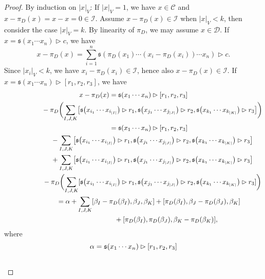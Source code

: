 \documentclass[10pt,a4paper]{amsart}
\numberwithin{equation}{section}
\begin{document}
\begin{proof} By induction on $|x|_V$: If $|x|_V=1$, we have $x \in \mathcal{C}$ and $x-\pi_D(x) = x-x =0 \in \mathcal{I}$. Assume $x-\pi_D(x) \in \mathcal{I}$ when $|x|_V <k$, then consider the case $|x|_V=k$. By linearity of $\pi_D$, we may assume $x \in \mathcal{D}$. If $x = \mathfrak{s}(x_1 \cdots x_n) \rhd c$, we have
\[
x - \pi_D(x) = \sum_{i=1}^n \mathfrak{s}(\pi_D(x_1) \cdots (x_i-\pi_D(x_i)) \cdots x_n) \rhd c.
\]
Since $|x_i|_V < k$, we have $x_i - \pi_D(x_i) \in \mathcal{I}$, hence also $x-\pi_D(x) \in \mathcal{I}$. If $x = \mathfrak{s}(x_1 \cdots x_n) \rhd [r_1, r_2, r_3]$, we have
\begin{gather*}
 x - \pi_D(x) = \mathfrak{s}(x_1 \cdots x_n) \rhd [r_1, r_2, r_3] \\ \hphantom{x - \pi_D(x) =}{}
 - \pi_D \biggl( \sum_{I,J,K} \bigl[\mathfrak{s}\bigl(x_{i_1} \cdots x_{i_{|I|}}\bigr) \rhd r_1, \mathfrak{s}\bigl(x_{j_1} \cdots x_{j_{|J|}}\bigr) \rhd r_2, \mathfrak{s}\bigl(x_{k_1} \cdots x_{k_{|K|}}\bigr) \rhd r_3\bigr] \biggr) \\ \hphantom{x - \pi_D(x) }{}
 = \mathfrak{s}(x_1 \cdots x_n) \rhd [r_1, r_2, r_3] \\ \hphantom{x - \pi_D(x) =}{}
 - \sum_{I,J,K} \bigl[\mathfrak{s}\bigl(x_{i_1} \cdots x_{i_{|I|}}\bigr) \rhd r_1, \mathfrak{s}\bigl(x_{j_1} \cdots x_{j_{|J|}}\bigr) \rhd r_2, \mathfrak{s}\bigl(x_{k_1} \cdots x_{k_{|K|}}\bigr) \rhd r_3\bigr] \\ \hphantom{x - \pi_D(x) =}{}
 + \sum_{I,J,K} \bigl[\mathfrak{s}\bigl(x_{i_1} \cdots x_{i_{|I|}}\bigr) \rhd r_1, \mathfrak{s}\bigl(x_{j_1} \cdots x_{j_{|J|}}\bigr) \rhd r_2, \mathfrak{s}\bigl(x_{k_1} \cdots x_{k_{|K|}}\bigr) \rhd r_3\bigr] \\ \hphantom{x - \pi_D(x) =}{}
 - \pi_D \biggl( \sum_{I,J,K} [\mathfrak{s}\bigl(x_{i_1} \cdots x_{i_{|I|}}\bigr) \rhd r_1, \mathfrak{s}\bigl(x_{j_1} \cdots x_{j_{|J|}}\bigr) \rhd r_2, \mathfrak{s}\bigl(x_{k_1} \cdots x_{k_{|K|}}\bigr) \rhd r_3] \biggr) \\ \hphantom{x - \pi_D(x)}{}
 = \alpha + \sum_{I,J,K} [\beta_I - \pi_D(\beta_I),\beta_J, \beta_K] + [\pi_D(\beta_I), \beta_J - \pi_D(\beta_J), \beta_K] \\ \hphantom{x - \pi_D(x) =\alpha + \sum_{I,J,K}}{}
 + [\pi_D(\beta_I), \pi_D(\beta_J), \beta_K -\pi_D(\beta_K)],
\end{gather*}
where
\begin{gather*}
\alpha = \mathfrak{s}(x_1 \cdots x_n) \rhd [r_1, r_2, r_3] \\ \hphantom{\alpha =}{}

\end{gather*}
\end{proof}
\end{document}

